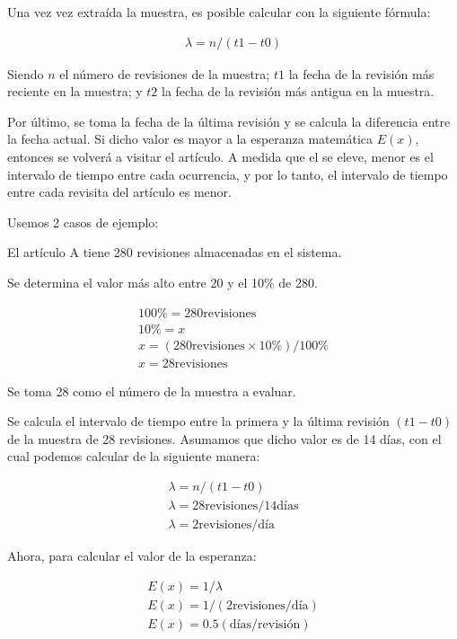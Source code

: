 Una vez vez extraída la muestra, es posible calcular  con la siguiente fórmula:

\begin{gather*}
\lambda = n / (t1 - t0)
\end{gather*}

Siendo $n$ el número de revisiones de la muestra;
$t1$ la fecha de la revisión más reciente en la muestra;
y $t2$ la fecha de la revisión más antigua en la muestra.

Por último, se toma la fecha de la última revisión y se calcula la diferencia entre la fecha actual.
Si dicho valor es mayor a la esperanza matemática $E(x)$, entonces se volverá a visitar el artículo.
A medida que el  se eleve, menor es el intervalo de tiempo entre cada ocurrencia, y por lo tanto, el intervalo de tiempo entre cada revisita del artículo es menor.

Usemos 2 casos de ejemplo:

El artículo A tiene 280 revisiones almacenadas en el sistema.

Se determina el valor más alto entre 20 y el 10\% de 280.

\begin{gather*}
100\% = 280 \text{revisiones}\\
10\% = x\\
x = (280 \text{revisiones} \times 10\%) / 100\%\\
x = 28 \text{revisiones}
\end{gather*}

Se toma 28 como el número de la muestra a evaluar.

Se calcula el intervalo de tiempo entre la primera y la última revisión $(t1 - t0)$ de la muestra de 28 revisiones.
Asumamos que dicho valor es de 14 días, con el cual podemos calcular  de la siguiente manera:

\begin{gather*}
\lambda = n / (t1 - t0)\\
\lambda = 28 \text{revisiones} / 14 \text{días}\\
\lambda = 2 \text{revisiones} / \text{día}
\end{gather*}

Ahora, para calcular el valor de la esperanza:

\begin{gather*}
E(x)= 1 / \lambda\\
E(x)= 1 / (2 \text{revisiones} / \text{día})\\
E(x)= 0.5 (\text{días} / \text{revisión})
\end{gather*}

